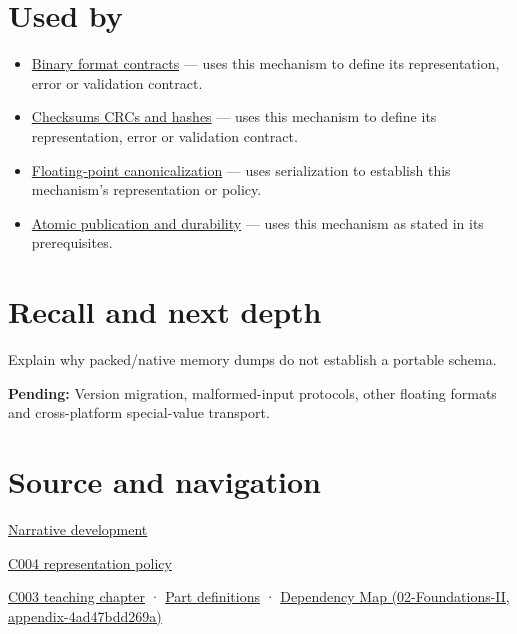 \section{Used by}\label{appendix-91d09ebed979-used-by}

\begin{itemize}
\item
  \hyperref[appendix-590bbb2424c1]{Binary format contracts} --- uses this mechanism to define its representation, error or validation contract.
\item
  \hyperref[appendix-ed338677de0a]{Checksums CRCs and hashes} --- uses this mechanism to define its representation, error or validation contract.
\item
  \hyperref[appendix-e90053a4b201]{Floating-point canonicalization} --- uses serialization to establish this mechanism's representation or policy.
\item
  \hyperref[appendix-e89a8f290ef5]{Atomic publication and durability} --- uses this mechanism as stated in its prerequisites.
\end{itemize}

\section{Recall and next depth}\label{appendix-91d09ebed979-recall-and-next-depth}

Explain why packed/native memory dumps do not establish a portable schema.

\textbf{Pending:} Version migration, malformed-input protocols, other floating formats and cross-platform special-value transport.

\section{Source and navigation}\label{appendix-91d09ebed979-source-and-navigation}

\href{Continuous\%20Notes/Computing\%20Foundations\%20-\%20From\%20Bits\%20to\%20C++\%20and\%20Systems\%20APIs\#Bytes\%20become\%20a\%20durable\%20agreement}{Narrative development}

\href{Continuous\%20Notes/Computing\%20Foundations\%20-\%20From\%20Bits\%20to\%20C++\%20and\%20Systems\%20APIs\#A\%20stretching\%20ruler\%20for\%20real-valued\%20quantities}{C004 representation policy}

\href{Continuous\%20Notes/Computing\%20Foundations\%20-\%20From\%20Bits\%20to\%20C++\%20and\%20Systems\%20APIs\#Where\%20the\%20bytes\%20live}{C003 teaching chapter} · \hyperref[appendix-fd090d982a15-m003---parts-41-60]{Part definitions} · \href{../02-Foundations-II/main.pdf\#nameddest=appendix-4ad47bdd269a}{Dependency Map (02-Foundations-II, appendix-4ad47bdd269a)}

